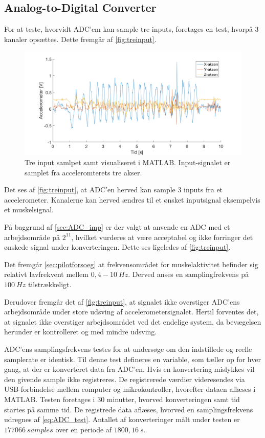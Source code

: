 \subsection{Analog-to-Digital Converter}

For at teste, hvorvidt ADC'em kan sample tre inputs, foretages en test, hvorpå 3 kanaler opsættes. Dette fremgår af \autoref{fig:treinput}.

\begin{figure}[H]
\centering
\includegraphics[width=1\textwidth]{figures/treinput}
\caption{Tre input samlpet samt visualiseret i MATLAB. Input-signalet er samplet fra acceleromterets tre akser.}
\label{fig:treinput}
\end{figure}

\noindent
Det ses af \autoref{fig:treinput}, at ADC'en herved kan sample 3 inputs fra et accelerometer. Kanalerne kan herved ændres til et ønsket inputsignal eksempelvis et muskelsignal. 

På baggrund af \autoref{sec:ADC_imp} er der valgt at anvende en ADC med et arbejdsområde på $2^{11}$, hvilket vurderes at være acceptabel og ikke forringer det ønskede signal under konverteringen. Dette ses ligeledes af \autoref{fig:treinput}.

Det fremgår \autoref{sec:pilotforsoeg} at frekvensområdet for muskelaktivitet befinder sig relativt lavfrekvent mellem $0,4-10~Hz$. Derved anses en samplingfrekvens på $100~Hz$ tilstrækkeligt. 

Derudover fremgår det af \autoref{fig:treinput}, at signalet ikke overstiger ADC'ens arbejdsområde under store udsving af accelerometersignalet. Hertil forventes det, at signalet ikke overstiger arbejdsområdet ved det endelige system, da bevægelsen herunder er kontrolleret og med mindre udsving.

ADC'ens samplingsfrekvens testes for at undersøge om den indstillede og reelle samplerate er identisk. Til denne test defineres en variable, som tæller op for hver gang, at der er konverteret data fra ADC'en. Hvis en konvertering mislykkes vil den givende sample ikke registreres. De registrerede værdier videresendes via USB-forbindelse mellem computer og mikrokontroller, hvorefter dataen aflæses i MATLAB. 
Testen foretages i 30 minutter, hvorved konverteringen samt tid startes på samme tid. De registrede data aflæses, hvorved en samplingsfrekvens udregnes af \autoref{eq:ADC_test}. Antallet af konverteringer målt under testen er $177066~samples$ over en periode af $1800,16~s$.

